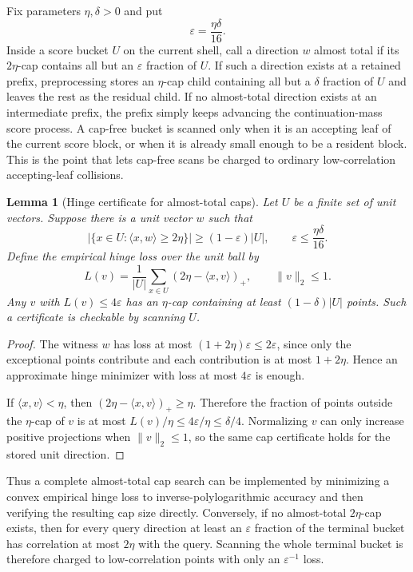 \documentclass[10pt]{article}
\newtheorem{lemma}[theorem]{Lemma}
\theoremstyle{definition}
\newcommand{\ip}[2]{\langle #1,#2\rangle}
\begin{document}
Fix parameters $\eta,\delta>0$ and put
\[
   \varepsilon=\frac{\eta\delta}{16}.
\]
Inside a score bucket $U$ on the current shell, call a direction $w$ almost total if its $2\eta$-cap contains all but an $\varepsilon$ fraction of $U$. If such a direction exists at a retained prefix, preprocessing stores an $\eta$-cap child containing all but a $\delta$ fraction of $U$ and leaves the rest as the residual child. If no almost-total direction exists at an intermediate prefix, the prefix simply keeps advancing the continuation-mass score process. A cap-free bucket is scanned only when it is an accepting leaf of the current score block, or when it is already small enough to be a resident block. This is the point that lets cap-free scans be charged to ordinary low-correlation accepting-leaf collisions.

\begin{lemma}[Hinge certificate for almost-total caps]\label{lem:almost-total-cap-finder}
   Let $U$ be a finite set of unit vectors. Suppose there is a unit vector $w$ such that
   \[
      \left|\{x\in U:\ip{x}{w}\ge2\eta\}\right|
      \ge
      (1-\varepsilon)|U|,
      \qquad
      \varepsilon\le\frac{\eta\delta}{16}.
   \]
   Define the empirical hinge loss over the unit ball by
   \[
      L(v)=\frac1{|U|}\sum_{x\in U}(2\eta-\ip{x}{v})_+,
      \qquad
      \|v\|_2\le1.
   \]
   Any $v$ with $L(v)\le4\varepsilon$ has an $\eta$-cap containing at least $(1-\delta)|U|$ points. Such a certificate is checkable by scanning $U$.
\end{lemma}

\begin{proof}
   The witness $w$ has loss at most $(1+2\eta)\varepsilon\le2\varepsilon$, since only the exceptional points contribute and each contribution is at most $1+2\eta$. Hence an approximate hinge minimizer with loss at most $4\varepsilon$ is enough.

   If $\ip{x}{v}<\eta$, then $(2\eta-\ip{x}{v})_+\ge\eta$. Therefore the fraction of points outside the $\eta$-cap of $v$ is at most $L(v)/\eta\le4\varepsilon/\eta\le\delta/4$. Normalizing $v$ can only increase positive projections when $\|v\|_2\le1$, so the same cap certificate holds for the stored unit direction.
\end{proof}

Thus a complete almost-total cap search can be implemented by minimizing a convex empirical hinge loss to inverse-polylogarithmic accuracy and then verifying the resulting cap size directly. Conversely, if no almost-total $2\eta$-cap exists, then for every query direction at least an $\varepsilon$ fraction of the terminal bucket has correlation at most $2\eta$ with the query. Scanning the whole terminal bucket is therefore charged to low-correlation points with only an $\varepsilon^{-1}$ loss.
\end{document}
